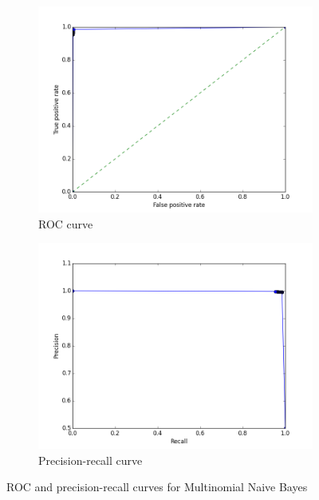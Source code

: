 \documentclass{article} %
\begin{document}
\begin{figure}[h]
  \centering
  \begin{subfigure}{0.35\textwidth}
    \includegraphics[width=\textwidth]{images/naive_bayes_roc_curve.png}
    \caption{ROC curve}
  \end{subfigure}
  \begin{subfigure}{0.35\textwidth}
    \includegraphics[width=\textwidth]{images/naive_bayes_pr_curve.png}
    \caption{Precision-recall curve}
  \end{subfigure}
  \caption{ROC and precision-recall curves for Multinomial Naive Bayes}
  \label{fig:nb}
\end{figure}

\end{document}
